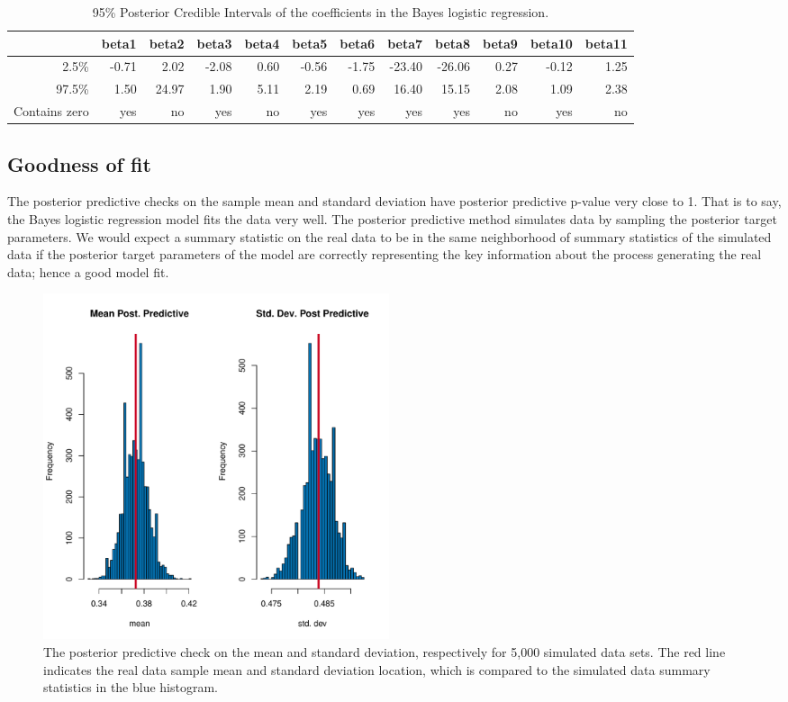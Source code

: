 \documentclass[11pt]{amsart}
\begin{document}
\begin{table}[ht]
\centering
\caption{95\% Posterior Credible Intervals of the coefficients in the Bayes logistic regression.}
\begin{tabular}{rrrrrrrrrrrr}
  \hline
 & beta1 & beta2 & beta3 & beta4 & beta5 & beta6 & beta7 & beta8 & beta9 & beta10 & beta11 \\ 
  \hline
2.5\% & -0.71 & 2.02 & -2.08 & 0.60 & -0.56 & -1.75 & -23.40 & -26.06 & 0.27 & -0.12 & 1.25 \\ 
  97.5\% & 1.50 & 24.97 & 1.90 & 5.11 & 2.19 & 0.69 & 16.40 & 15.15 & 2.08 & 1.09 & 2.38 \\ 
Contains zero & yes & no & yes & no & yes & yes & yes & yes & no & yes & no \\
   \hline
\end{tabular}
\end{table}
\subsection*{Goodness of fit}

The posterior predictive checks on the sample mean and standard deviation have posterior predictive p-value very close to 1. That is to say, the Bayes logistic regression model fits the data very well. The posterior predictive method simulates data by sampling the posterior target parameters. We would expect a summary statistic on the real data to be in the same neighborhood of summary statistics of the simulated data if the posterior target parameters of the model are correctly representing the key information about the process generating the real data; hence a good model fit.
\begin{figure}[htbp] %
   \centering
   \includegraphics[width=4in]{BayesLogit/real_data_posterior_predictive.pdf} 
   \caption{The posterior predictive check on the mean and standard deviation, respectively for 5,000 simulated data sets. The red line indicates the real data sample mean and standard deviation location, which is compared to the  simulated data summary statistics in the blue histogram.}
   \label{fig:coverage-q2}
\end{figure}
\end{document}
